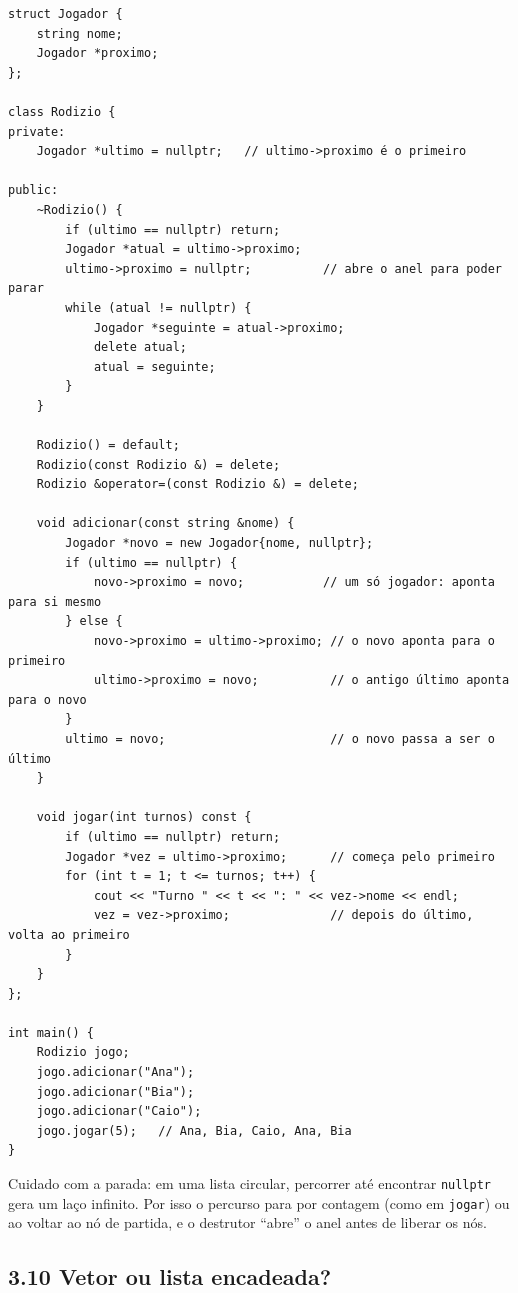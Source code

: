 \begin{codigo}
\begin{Verbatim}[breaklines=true, breaksymbolleft={}, fontsize=\footnotesize]
struct Jogador {
    string nome;
    Jogador *proximo;
};

class Rodizio {
private:
    Jogador *ultimo = nullptr;   // ultimo->proximo é o primeiro

public:
    ~Rodizio() {
        if (ultimo == nullptr) return;
        Jogador *atual = ultimo->proximo;
        ultimo->proximo = nullptr;          // abre o anel para poder parar
        while (atual != nullptr) {
            Jogador *seguinte = atual->proximo;
            delete atual;
            atual = seguinte;
        }
    }

    Rodizio() = default;
    Rodizio(const Rodizio &) = delete;
    Rodizio &operator=(const Rodizio &) = delete;

    void adicionar(const string &nome) {
        Jogador *novo = new Jogador{nome, nullptr};
        if (ultimo == nullptr) {
            novo->proximo = novo;           // um só jogador: aponta para si mesmo
        } else {
            novo->proximo = ultimo->proximo; // o novo aponta para o primeiro
            ultimo->proximo = novo;          // o antigo último aponta para o novo
        }
        ultimo = novo;                       // o novo passa a ser o último
    }

    void jogar(int turnos) const {
        if (ultimo == nullptr) return;
        Jogador *vez = ultimo->proximo;      // começa pelo primeiro
        for (int t = 1; t <= turnos; t++) {
            cout << "Turno " << t << ": " << vez->nome << endl;
            vez = vez->proximo;              // depois do último, volta ao primeiro
        }
    }
};

int main() {
    Rodizio jogo;
    jogo.adicionar("Ana");
    jogo.adicionar("Bia");
    jogo.adicionar("Caio");
    jogo.jogar(5);   // Ana, Bia, Caio, Ana, Bia
}
\end{Verbatim}
\end{codigo}

Cuidado com a parada: em uma lista circular, percorrer até encontrar \texttt{nullptr} gera um laço infinito. Por isso o percurso para por contagem (como em \texttt{jogar}) ou ao voltar ao nó de partida, e o destrutor ``abre'' o anel antes de liberar os nós.

\subsection{3.10 Vetor ou lista encadeada?}

